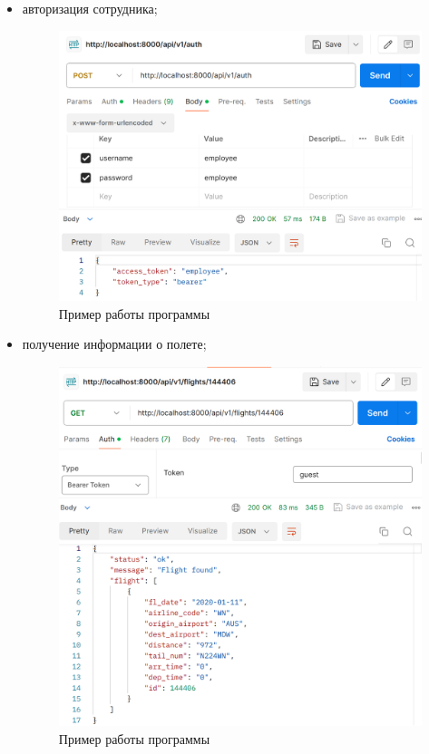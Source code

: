 \begin{itemize}
    \item авторизация сотрудника;
    \begin{figure}[H]
        \centering
        \includegraphics[scale=0.2]{inc/example_employee}
        \caption{Пример работы программы}
        \label{fig:example_employee}
    \end{figure}

    \item получение информации о полете;
    \begin{figure}[H]
              \centering
              \includegraphics[scale=0.2]{inc/example_flight}
              \caption{Пример работы программы}
              \label{fig:example_flight}
    \end{figure}


\end{itemize}
